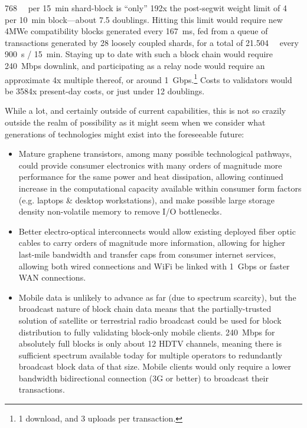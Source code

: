 \SI{768}{\mega\weight} per \SI{15}{\minute} shard-block is ``only''
\num{192}x the post-segwit weight limit of \SI{4}{\mega\weight} per
\SI{10}{\minute} block---about \num{7.5} doublings.  Hitting this
limit would require new 4MWe compatibility blocks generated every
\SI{167}{\milli\second}, fed from a queue of transactions generated by
\num{28} loosely coupled shards, for a total of
\SI{21.504}{\giga\weight} every \SI{900}{\second} / \SI{15}{\minute}.
Staying up to date with such a block chain would require
\SI{240}{Mbps} downlink, and participating as a relay node would
require an approximate \num{4}x multiple thereof, or around
\SI{1}{Gbps}.\footnote{\num{1} download, and \num{3} uploads per
  transaction.}  Costs to validators would be \num{3584}x present-day
costs, or just under \num{12} doublings.

While a lot, and certainly outside of current capabilities, this is
not so crazily outside the realm of possibility as it might seem when
we consider what generations of technologies might exist into the
foreseeable future:

\begin{itemize}
  \item

    Mature graphene transistors, among many possible technological
    pathways, could provide consumer electronics with many orders of
    magnitude more performance for the same power and heat
    dissipation, allowing continued increase in the computational
    capacity available within consumer form factors (e.g. laptops \&
    desktop workstations), and make possible large storage density
    non-volatile memory to remove I/O bottlenecks.

  \item

    Better electro-optical interconnects would allow existing deployed
    fiber optic cables to carry orders of magnitude more information,
    allowing for higher last-mile bandwidth and transfer caps from
    consumer internet services, allowing both wired connections and
    WiFi be linked with \SI{1}{Gbps} or faster WAN connections.

  \item

    Mobile data is unlikely to advance as far (due to spectrum
    scarcity), but the broadcast nature of block chain data means that
    the partially-trusted solution of satellite or terrestrial radio
    broadcast could be used for block distribution to fully validating
    block-only mobile clients.  \SI{240}{Mbps} for absolutely full
    blocks is only about \num{12} HDTV channels, meaning there is
    sufficient spectrum available today for multiple operators to
    redundantly broadcast block data of that size.  Mobile clients
    would only require a lower bandwidth bidirectional connection (3G
    or better) to broadcast their transactions.

\end{itemize}

